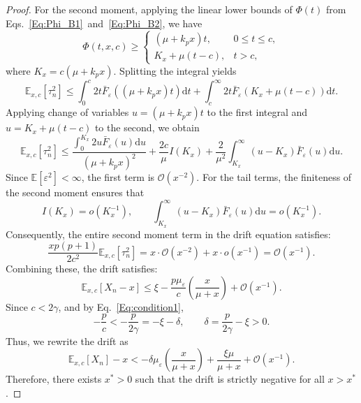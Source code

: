 \documentclass[11pt]{article}
\newcommand{\D}{\mathrm{d}}
\theoremstyle{definition}
\begin{document}
\begin{proof}
	For the second moment, applying the linear lower bounds of $\Phi(t)$ from Eqs.~\eqref{Eq:Phi_B1}~and~\eqref{Eq:Phi_B2}, we have
	\[
	\Phi(t,x,c)\ge
	\begin{cases}
		(\mu+k_p x)t, & 0\le t\le c,\\
		K_x +\mu(t-c), & t>c,
	\end{cases}
	\]
	where $K_x = c(\mu + k_p x)$. 
	Splitting the integral yields
	\begin{equation}
		\mathbb{E}_{x,c}[\tau_n^2] \le \int_0^c 2t \bar{F}_\varepsilon((\mu + k_p x)t) \D t + \int_c^\infty 2t \bar{F}_\varepsilon(K_x + \mu(t-c)) \D t.
	\end{equation}
	Applying change of variables $u = (\mu + k_p x)t$ to the first integral and $u = K_x + \mu(t-c)$ to the second, we obtain
	\begin{equation}
		\mathbb{E}_{x,c}[\tau_n^2] \le \frac{\int_0^{K_x} 2u \bar{F}_\varepsilon(u) \D u}{(\mu + k_p x)^2} + \frac{2c}{\mu} I(K_x) + \frac{2}{\mu^2} \int_{K_x}^\infty (u - K_x) \bar{F}_\varepsilon(u) \D u.
	\end{equation}
	Since $\mathbb{E}[\varepsilon^2] < \infty$, the first term is $\mathcal{O}(x^{-2})$. For the tail terms, the finiteness of the second moment ensures that 
	$$I(K_x) = o\left(K_x^{-1}\right), \quad\quad \int_{K_x}^\infty (u - K_x) \bar{F}_\varepsilon(u) \D u = o(K_x^{-1}).$$
	Consequently, the entire second moment term in the drift equation satisfies:
	\begin{equation}
		\frac{xp(p+1)}{2c^2} \mathbb{E}_{x,c}[\tau_n^2] = x \cdot \mathcal{O}(x^{-2}) + x \cdot o(x^{-1}) = \mathcal{O}(x^{-1}).
	\end{equation}
	Combining these, the drift satisfies:
	\begin{equation}
		\mathbb{E}_{x,c}[X_n - x] \le \xi - \frac{p \mu_{\varepsilon}}{c} \left( \frac{x}{\mu + x} \right) + \mathcal{O}(x^{-1}).
	\end{equation}
	Since $ c < 2 \gamma$, and by Eq.~\eqref{Eq:condition1}, 
	$$  -\frac{p}{c} < - \frac{p}{2\gamma}  = - \xi  - \delta, \quad\quad
	\delta = \frac{p}{2\gamma}-\xi >0.$$
	Thus, we rewrite the drift as
	$$ \mathbb{E}_{x,c}[X_n] - x < -\delta \mu_{\varepsilon} \left( \frac{x}{\mu + x} \right) +    \frac{\xi \mu}{\mu + x} + \mathcal O(x^{-1}).$$	
	Therefore, there exists \(x^*>0\) such that the drift is strictly negative for all \(x>x^*\).
\end{proof}
\end{document}
